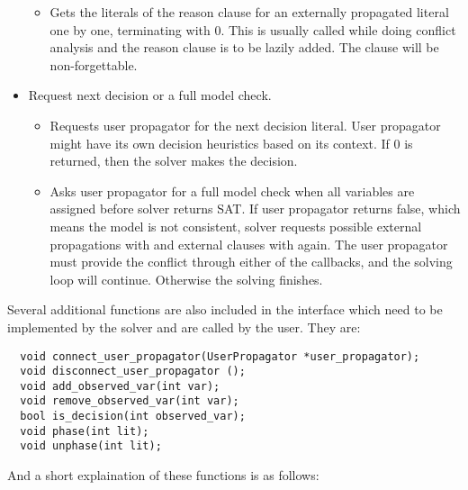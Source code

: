 \begin{itemize}
\begin{itemize}
      \item {} Gets the literals of the reason clause for an externally propagated literal one by one, terminating with 0. This is usually called while doing conflict analysis and the reason clause is to be lazily added. The clause will be non-forgettable.
    \end{itemize}
  \item Request next decision or a full model check.
    \begin{itemize}
      \item {} Requests user propagator for the next decision literal. User propagator might have its own decision heuristics based on its context. If 0 is returned, then the solver makes the decision.
      \item {} Asks user propagator for a full model check when all variables are assigned before solver returns SAT. If user propagator returns false, which means the model is not consistent, solver requests possible external propagations with  and external clauses with  again. The user propagator must provide the conflict through either of the callbacks, and the solving loop will continue. Otherwise the solving finishes.
    \end{itemize}
\end{itemize}

Several additional functions are also included in the interface which need to be implemented by the solver and are called by the user. They are:

\begin{lstlisting}
  void connect_user_propagator(UserPropagator *user_propagator);
  void disconnect_user_propagator ();
  void add_observed_var(int var);
  void remove_observed_var(int var);
  bool is_decision(int observed_var);
  void phase(int lit);
  void unphase(int lit);
\end{lstlisting}

And a short explaination of these functions is as follows:

